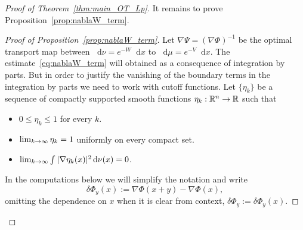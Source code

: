 \documentclass[10pt,a4paper]{amsart}
\newcommand{\R}{\mathbb R}
\newcommand{\V}{V}
\newcommand{\W}{W}
\newcommand{\dd}{n}
\newcommand{\source}{\mu}
\newcommand{\target}{\nu}
\newcommand*\diff{\mathop{}\!\mathrm{d}}
\newcommand{\OT}{\Phi}
\newcommand{\findiff}{\delta\OT}
\renewcommand*{\to}{\mathchoice{\longrightarrow}{\rightarrow}{\rightarrow}{\rightarrow}}
\theoremstyle{definition}\newtheorem{defi}[theo]{Definition}
\begin{document}
\begin{proof}[Proof of Theorem~\ref{thm:main_OT_Lp}]
It remains to prove Proposition~\ref{prop:nablaW_term}.
\begin{proof}[Proof of Proposition~\ref{prop:nablaW_term}]
Let $\nabla\Psi=(\nabla \OT)^{-1}$ be the optimal transport map between $\diff \target=e^{-\W}\diff x$ to $\diff \source=e^{-\V}\diff x$. The estimate~\eqref{eq:nablaW_term} will obtained as a consequence of integration by parts. But in order to justify the vanishing of the boundary terms in the integration by parts we need to work with cutoff functions. Let $\{\eta_k\}$ be a sequence of compactly supported smooth functions $\eta_k:\R^{\dd}\to \R$ such that
\begin{itemize}
\item $0\le \eta_k\le 1$ for every $k$.
\item $\lim_{k\to\infty}\eta_k=1$ uniformly on every compact set.
\item $\lim_{k\to\infty}\int |\nabla\eta_k(x)|^2 \diff\target(x)=0$.
\end{itemize}
In the computations below we will simplify the notation and write
\[
\findiff_y(x):=\nabla \OT(x+y)-\nabla \OT(x),
\]
omitting the dependence on $x$ when it is clear from context, $\findiff_y:=\findiff_y(x)$.


\end{proof}
\end{proof}
\end{document}

